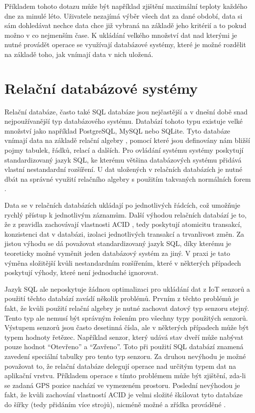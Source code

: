 Příkladem tohoto dotazu může být například zjištění maximální teploty každého dne za minulé léto. Uživatele nezajímá výběr všech dat za dané období, data si sám dohledávat nechce data chce již vybraná na základě jeho kritérií a to pokud možno v co nejmenším čase. K ukládání velkého množství dat nad kterými je nutné provádět operace se využívají databázové systémy, které je možné rozdělit na základě toho, jak vnímají data v nich uložená.

\section{Relační databázové systémy}
Relační databáze, často také SQL databáze jsou nejčastější a v dnešní době snad nejpoužívanější typ databázového systému. Databází tohoto typu existuje velké množství jako například PostgreSQL, MySQL nebo SQLite. Tyto databáze vnímají data na základě relační algebry \cite{Codd2002}, pomocí které jsou definovány nám bližší pojmy tabulek, řádků, relací a dalších. Pro ovládání systému systémy poskytují standardizovaný jazyk SQL, ke kterému většina databázových systému přidává vlastní nestandardní rozšíření. U dat uložených v relačních databázích je nutné dbát na správné využití relačního algebry s použitím takvaných normálních forem \cite{KOHLER201888}. 

Data se v relačních databázích ukládají po jednotlivých řádcích, což umožňuje rychlý přístup k jednotlivým záznamům. Další výhodou relačních databází je to, že z pravidla zachovávají vlastnosti ACID \cite{10.1145/289.291}, tedy poskytují atomicitu transakcí, konzistenci dat v databázi, izolaci jednotlivých transakcí a trvanlivost změn. Za jistou výhodu se dá považovat standardizovaný jazyk SQL, díky kterému je teoreticky možné vyměnit jeden databázový systém za jiný. V praxi je tato výměna složitější kvůli nestandardním rozšířením, které v některých případech poskytují výhody, které není jednoduché ignorovat.

Jazyk SQL ale neposkytuje žádnou optimalizaci pro ukládání dat z IoT senzorů a použití těchto databází zavádí několik problémů. Prvním z těchto problémů je fakt, že kvůli použití relační algebry je nutné zachovat datový typ senzoru stejný. Tento typ ale nemusí být správným řešením pro všechny typy použitých senzorů. Výstupem senzorů jsou často desetinná čísla, ale v některých případech může být typem hodnoty řetězec. Například senzor, který udává stav dveří může nabývat pouze hodnot “Otevřeno” a “Zavřeno”. Toto při použití SQL databází znamená zavedení speciální tabulky pro tento typ senzoru. Za druhou nevýhodu je možné považovat to, že relační databáze delegují operace nad určitým typem dat na aplikační vrstvu. Příkladem operace s tímto problémem může být zjištění, zda-li se zadaná GPS pozice nachází ve vymezeném prostoru. Poslední nevýhodou je fakt, že kvůli zachování vlastností ACID je velmi složité škálovat tyto databáze do šířky (tedy přidáním více strojů), nicméně možné a zřídka prováděné \cite{10.1145/1966989.1971597}.
